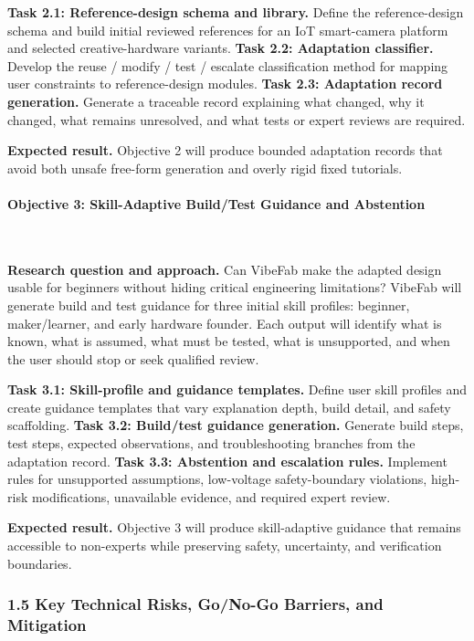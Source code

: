\textbf{Task 2.1: Reference-design schema and library.} Define the reference-design schema and build initial reviewed references for an IoT smart-camera platform and selected creative-hardware variants.
\textbf{Task 2.2: Adaptation classifier.} Develop the reuse / modify / test / escalate classification method for mapping user constraints to reference-design modules.
\textbf{Task 2.3: Adaptation record generation.} Generate a traceable record explaining what changed, why it changed, what remains unresolved, and what tests or expert reviews are required.

\textbf{Expected result.} Objective 2 will produce bounded adaptation records that avoid both unsafe free-form generation and overly rigid fixed tutorials.

\vspace{-10pt}
\paragraph{Objective 3: Skill-Adaptive Build/Test Guidance and Abstention}~{}

\textbf{Research question and approach.} Can VibeFab make the adapted design usable for beginners without hiding critical engineering limitations? VibeFab will generate build and test guidance for three initial skill profiles: beginner, maker/learner, and early hardware founder. Each output will identify what is known, what is assumed, what must be tested, what is unsupported, and when the user should stop or seek qualified review.

\textbf{Task 3.1: Skill-profile and guidance templates.} Define user skill profiles and create guidance templates that vary explanation depth, build detail, and safety scaffolding.
\textbf{Task 3.2: Build/test guidance generation.} Generate build steps, test steps, expected observations, and troubleshooting branches from the adaptation record.
\textbf{Task 3.3: Abstention and escalation rules.} Implement rules for unsupported assumptions, low-voltage safety-boundary violations, high-risk modifications, unavailable evidence, and required expert review.

\textbf{Expected result.} Objective 3 will produce skill-adaptive guidance that remains accessible to non-experts while preserving safety, uncertainty, and verification boundaries.


\subsubsection*{1.5 Key Technical Risks, Go/No-Go Barriers, and Mitigation}

